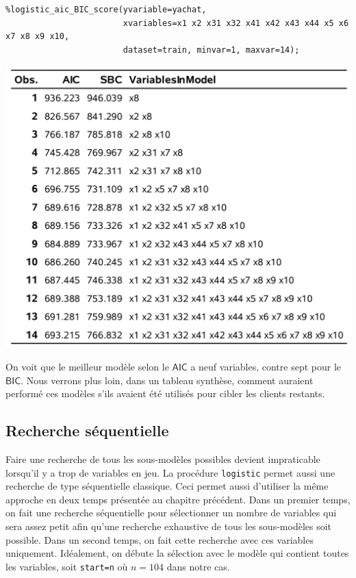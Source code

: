 \documentclass[
  11pt,
  letterpaper,
]{book}
\theoremstyle{definition}
\theoremstyle{definition}
\theoremstyle{definition}
\theoremstyle{remark}
\begin{document}
\begin{verbatim}
%logistic_aic_BIC_score(yvariable=yachat,
                        xvariables=x1 x2 x31 x32 x41 x42 x43 x44 x5 x6 x7 x8 x9 x10,
                        dataset=train, minvar=1, maxvar=14);
\end{verbatim}

\begin{center}\includegraphics[width=0.8\linewidth]{figures/03-logistic-e21} \end{center}

On voit que le meilleur modèle selon le \(\mathsf{AIC}\) a neuf variables, contre sept pour le \(\mathsf{BIC}\). Nous verrons plus loin, dans un tableau synthèse, comment auraient performé ces modèles s'ils avaient été utilisés pour cibler les clients restants.

\hypertarget{recherche-suxe9quentielle}{%
\subsection{Recherche séquentielle}\label{recherche-suxe9quentielle}}

Faire une recherche de tous les sous-modèles possibles devient impraticable lorsqu'il y a trop de variables en jeu. La procédure \texttt{logistic} permet aussi une recherche de type séquentielle classique. Ceci permet aussi d'utiliser la même approche en deux temps présentée au chapitre précédent. Dans un premier temps, on fait une recherche séquentielle pour sélectionner un nombre de variables qui sera assez petit afin qu'une recherche exhaustive de tous les sous-modèles soit possible. Dans un second temps, on fait cette recherche avec ces variables uniquement. Idéalement, on débute la sélection avec le modèle qui contient toutes les variables, soit \texttt{start=n} où \(n=104\) dans notre cas.
\end{document}
